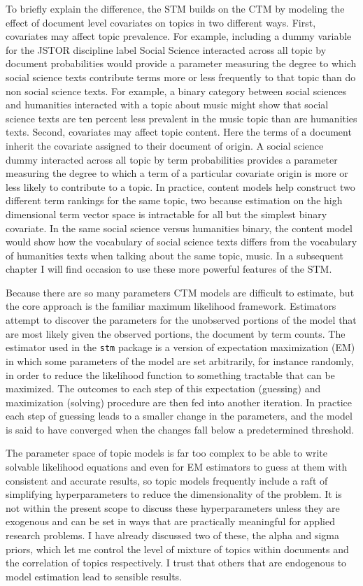 \documentclass[]{book}
\theoremstyle{definition}
\theoremstyle{definition}
\theoremstyle{definition}
\theoremstyle{remark}
\begin{document}
To briefly explain the difference, the STM builds on the CTM by modeling
the effect of document level covariates on topics in two different ways.
First, covariates may affect topic prevalence. For example, including a
dummy variable for the JSTOR discipline label Social Science interacted
across all topic by document probabilities would provide a parameter
measuring the degree to which social science texts contribute terms more
or less frequently to that topic than do non social science texts. For
example, a binary category between social sciences and humanities
interacted with a topic about music might show that social science texts
are ten percent less prevalent in the music topic than are humanities
texts. Second, covariates may affect topic content. Here the terms of a
document inherit the covariate assigned to their document of origin. A
social science dummy interacted across all topic by term probabilities
provides a parameter measuring the degree to which a term of a
particular covariate origin is more or less likely to contribute to a
topic. In practice, content models help construct two different term
rankings for the same topic, two because estimation on the high
dimensional term vector space is intractable for all but the simplest
binary covariate. In the same social science versus humanities binary,
the content model would show how the vocabulary of social science texts
differs from the vocabulary of humanities texts when talking about the
same topic, music. In a subsequent chapter I will find occasion to use
these more powerful features of the STM.

Because there are so many parameters CTM models are difficult to
estimate, but the core approach is the familiar maximum likelihood
framework. Estimators attempt to discover the parameters for the
unobserved portions of the model that are most likely given the observed
portions, the document by term counts. The estimator used in the
\texttt{stm} package is a version of expectation maximization (EM) in
which some parameters of the model are set arbitrarily, for instance
randomly, in order to reduce the likelihood function to something
tractable that can be maximized. The outcomes to each step of this
expectation (guessing) and maximization (solving) procedure are then fed
into another iteration. In practice each step of guessing leads to a
smaller change in the parameters, and the model is said to have
converged when the changes fall below a predetermined threshold.

The parameter space of topic models is far too complex to be able to
write solvable likelihood equations and even for EM estimators to guess
at them with consistent and accurate results, so topic models frequently
include a raft of simplifying hyperparameters to reduce the
dimensionality of the problem. It is not within the present scope to
discuss these hyperparameters unless they are exogenous and can be set
in ways that are practically meaningful for applied research problems. I
have already discussed two of these, the alpha and sigma priors, which
let me control the level of mixture of topics within documents and the
correlation of topics respectively. I trust that others that are
endogenous to model estimation lead to sensible results.
\end{document}

